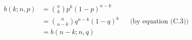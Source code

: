 \setlength{\abovedisplayskip}{-\baselineskip}
\begin{align*}
    b(k;n,p) &= \binom{n}{k}p^k(1-p)^{n-k} \\
    &= \binom{n}{n-k}q^{n-k}(1-q)^k && \text{(by equation (C.3))} \\
    &= b(n-k;n,q)
\end{align*}
